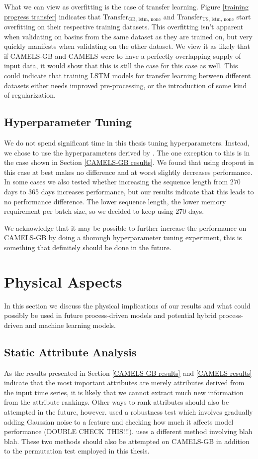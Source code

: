  What we can view as overfitting is the case of transfer learning. Figure 
 \ref{training progress transfer} indicates that Transfer$_\text{GB, lstm, none}$ 
 and Transfer$_\text{US, lstm, none}$ start overfitting on their respective training 
 datasets. This overfitting isn't apparent when validating on basins from the 
 same dataset as they are trained on, but very quickly manifests when validating 
 on the other dataset. We view it as likely that if CAMELS-GB and CAMELS were to 
 have a perfectly overlapping supply of input data, it would show that this is 
 still the case for this case as well. This could indicate that training LSTM models 
 for transfer learning between different datasets either needs improved pre-processing, 
 or the introduction of some kind of regularization. 
\subsection{Hyperparameter Tuning}
We do not spend significant time in this thesis tuning hyperparameters. Instead, 
we chose to use the hyperparameters derived by \citet{lstm_second_paper}. The one 
exception to this is in the case shown in Section \ref{CAMELS-GB results}. We found 
that using dropout in this case at best makes no difference and at worst slightly 
decreases performance. In some cases we also tested whether increasing the 
sequence length from 270 days to 365 days increases performance, but our results 
indicate that this leads to no performance difference. The lower sequence length, 
the lower memory requirement per batch size, so we decided to keep using 270 days. 

We acknowledge that it may be possible to further increase the performance on 
CAMELS-GB by doing a thorough hyperparameter tuning experiment, this is 
something that definitely should be done in the future. 
\section{Physical Aspects}
In this section we discuss the physical implications of our results and what could 
possibly be used in future process-driven models and potential hybrid process-driven 
and machine learning models.
\subsection{Static Attribute Analysis}
\label{discuss static attributes}
As the results presented in Section \ref{CAMELS-GB results} and \ref{CAMELS results} 
indicate that the most important attributes are merely attributes derived from the 
input time series, it is likely that we cannot extract much new information from 
the attribute rankings. Other ways to rank attributes should also be attempted 
in the future, however. \citet{lstm_second_paper} used a robustness test which 
involves gradually adding Gaussian noise to a feature and checking how much it 
affects model performance (DOUBLE CHECK THIS!!!). \citet{OrigCAMELSRanking} 
uses a different method involving blah blah. These two methods should also be 
attempted on CAMELS-GB in addition to the permutation test employed in this 
thesis.

